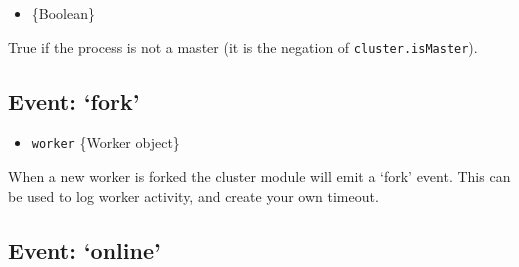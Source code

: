 \begin{itemize}
\itemsep1pt\parskip0pt
\item
  \{Boolean\}
\end{itemize}

True if the process is not a master (it is the negation of
\texttt{cluster.isMaster}).

\subsection{Event: `fork'}\label{event-fork}

\begin{itemize}
\itemsep1pt\parskip0pt
\item
  \texttt{worker} \{Worker object\}
\end{itemize}

When a new worker is forked the cluster module will emit a `fork' event.
This can be used to log worker activity, and create your own timeout.

\begin{Shaded}
\begin{Highlighting}[]
 
 \NormalTok{() \{}
  \NormalTok{(}\NormalTok{);}
\NormalTok{\}}

\NormalTok{(}\NormalTok{, }
  \NormalTok{timeouts[}\NormalTok{] = }\NormalTok{);}
\NormalTok{\});}
\NormalTok{(}\NormalTok{, }
  \NormalTok{(timeouts[}\NormalTok{]);}
\NormalTok{\});}
\NormalTok{(}\NormalTok{, }
  \NormalTok{(timeouts[}\NormalTok{]);}
  \NormalTok{();}
\NormalTok{\});}
\end{Highlighting}
\end{Shaded}

\subsection{Event: `online'}\label{event-online}

